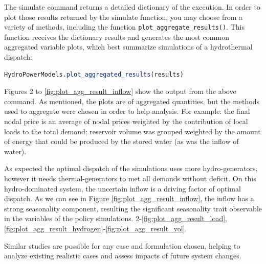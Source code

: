 \documentclass{juliacon}
\begin{document}
The simulate command returns a detailed dictionary of the execution. In order to plot those results returned by the simulate function, you may choose from a variety of methods, including the function \texttt{plot\_aggregate\_results()}. This function receives the dictionary results and generates the most common aggregated variable plots, which best summarize simulations of a hydrothermal dispatch:

\begin{lstlisting}[language = Julia]
HydroPowerModels.plot_aggregated_results(results)
\end{lstlisting}

Figures 2 to \ref{fig:plot_agg_result_inflow} show the output from the above command. As mentioned, the plots are of aggregated quantities, but the methods used to aggregate were chosen in order to help analysis. For example: the final nodal price is an average of nodal prices weighted by the contribution of local loads to the total demand; reservoir volume was grouped weighted by the amount of energy that could be produced by the stored water (as was the inflow of water).

As expected the optimal dispatch of the simulations uses more hydro-generators, however it needs thermal-generators to met all demands without deficit. On this hydro-dominated system, the uncertain inflow is a driving factor of optimal dispatch. As we can see in Figure \ref{fig:plot_agg_result_inflow}, the inflow has a strong seasonality component, resulting the significant seasonality trait observable in the variables of the policy simulations.
2-\ref{fig:plot_agg_result_load}, \ref{fig:plot_agg_result_hydrogen}-\ref{fig:plot_agg_result_vol}.

Similar studies are possible for any case and formulation chosen, helping to analyze existing realistic cases and assess impacts of future system changes. 

\end{document}
